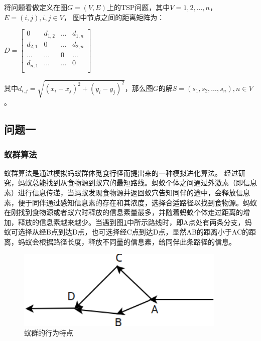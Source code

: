 \documentclass[fontset=windows,a4paper,12pt]{ctexart}
\begin{document}
      将问题看做定义在图$G=(V,E)$上的TSP问题，其中$V={1,2,\dots,n}$，$E=(i,j),i,j\in V$，
      图中节点之间的距离矩阵为：
      \begin{center}
      	      \begin{math}
      	      D=\left[
      	      \begin{array}{cccc}
      	      0 & d_{1,2} & \dots & d_{1,n}\\
      	      d_{2,1} & 0 & \dots & d_{2,n}\\
      	      \dots & \dots & 0 & \dots \\
      	      d_{n,1} & \dots & \dots & 0 \\
      	      \end{array}
      	      \right]
      	      \end{math}
      \end{center}
	  其中$d_{i,j}=\sqrt{(x_i-x_j)^2+(y_i-y_j)^2}$，那么图$G$的解$S=(s_1,s_2,\dots,s_n),n \in V$。
    \subsection{问题一}
	   \subsubsection{蚁群算法}
		   蚁群算法是通过模拟蚂蚁群体觅食行径而提出来的一种模拟进化算法\cite{士勇2004蚁群算法及其应用}。
		   经过研究，蚂蚁总能找到从食物源到蚁穴的最短路线。蚂蚁个体之间通过外激素（即信息素）进行信息传递，当蚂蚁发现食物源并返回蚁穴告知同伴的途中，会释放信息素，便于同伴通过感知信息素的存在和其浓度，选择合适路径以找到食物源。蚂蚁在刚找到食物源或者蚁穴时释放的信息素量最多，并随着蚂蚁个体走过距离的增加，释放的信息素越来越少。当遇到图\ref{fig:anti1}中所示路线时，即A点处有两条分支，蚂蚁可选择从经B点到达D点，也可选择经C点到达D点，显然AB的距离小于AC的距离，蚂蚁会根据路径长度，释放不同量的信息素，给同伴此条路径的信息\cite{马良2001蚂蚁算法在组合优化中的应用}。
    	   \begin{figure}[htbp]
    	   	\centering
    	   	\includegraphics[width=10cm]{pic/anti1.png}
    	   	\caption{蚁群的行为特点}
    	   	\label{fig:anti1}
    	   \end{figure}		   
\end{document}

